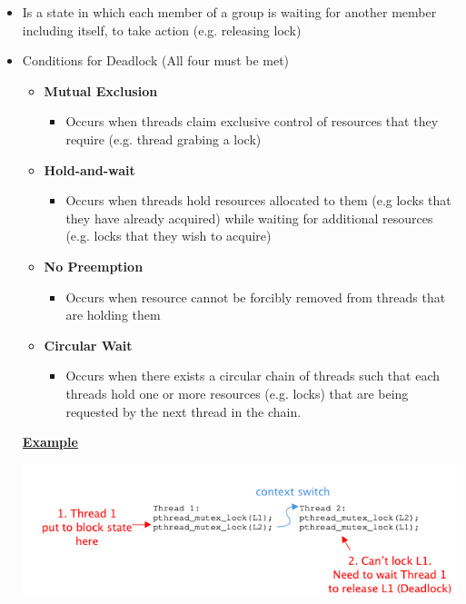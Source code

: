 \documentclass[12pt]{article}
\begin{document}
\begin{itemize}
    \item Is a state in which each member of a group is waiting for
    another member including itself, to take action (e.g. releasing lock)
    \item Conditions for Deadlock (All four must be met)

    \begin{itemize}
        \item \textbf{Mutual Exclusion}
        \begin{itemize}
            \item Occurs when threads claim exclusive control of resources that
            they require (e.g. thread grabing a lock)
        \end{itemize}
        \item \textbf{Hold-and-wait}
        \begin{itemize}
            \item Occurs when threads hold resources allocated to them (e.g locks that they have already acquired)
            while waiting for additional resources (e.g. locks that they wish to acquire)
        \end{itemize}

        \item \textbf{No Preemption}
        \begin{itemize}
            \item Occurs when resource cannot be forcibly removed from threads that are holding them
        \end{itemize}
        \item \textbf{Circular Wait}
        \begin{itemize}
            \item Occurs when there exists a circular chain of threads such that
            each threads hold one or more resources (e.g. locks) that are being
            requested by the next thread in the chain.
        \end{itemize}
    \end{itemize}

    \bigskip

    \underline{\textbf{Example}}

    \begin{center}
    \includegraphics[width=0.9\linewidth]{../images/midterm_2_solution_12.png}
    \end{center}


\end{itemize}
\end{document}
